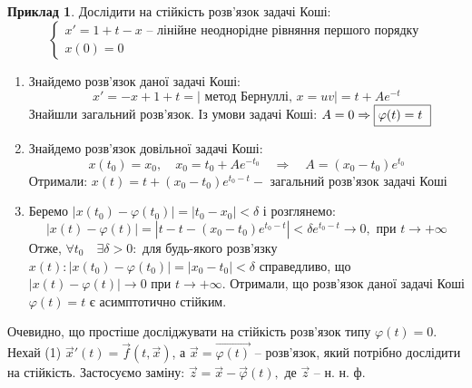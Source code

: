 \documentclass[14pt,a4paper]{scrartcl}
\theoremstyle{definition}
\newtheorem*{example}{Приклад}
\theoremstyle{definition}
\theoremstyle{definition}
\begin{document}
\begin{example}
    Дослідити на стійкість розв'язок  задачі Коші:
    $$
    \begin{cases}
        x' = 1 + t - x \text{  -- лінійне неоднорідне рівняння першого порядку}\\
        x(0) = 0
    \end{cases}
    $$
    \begin{enumerate}

    \item Знайдемо розв'язок даної задачі Коші:
    $$
    x' = - x + 1 + t = \left| \text{ метод Бернуллі, } x = uv \right| = t + Ae^{-t}
    $$
    Знайшли загальний розв'язок. Із умови задачі Коші: $ A = 0 \Rightarrow \fbox {$\varphi(t) = t$ }$

    \item Знайдемо розв'язок довільної задачі Коші:
    $$
    x(t_0) = x_0, \quad x_0 = t_0 + Ae^{-t_0} \quad \Rightarrow \quad A = (x_0 - t_0) e^{t_0}
    $$
    Отримали: $x(t) = t + (x_0 - t_0) e^{t_0 - t} - \text{ загальний розв'язок задачі Коші}$

    \item Беремо $\left| x(t_0) - \varphi(t_0) \right| = |t_0 - x_0| < \delta$ і розглянемо:
    $$\left| x(t) - \varphi(t) \right| = |t - t - (x_0 - t_0)e^{t_0 - t}| < \delta e^{t_0 - t} \rightarrow 0, \text{ при } t \rightarrow + \infty$$
    Отже, $\forall t_0 \quad \exists \delta > 0 :$ для будь-якого розв'язку $x(t): |x(t_0) - \varphi(t_0)| = |x_0 - t_0| < \delta$ справедливо, що $|x(t) - \varphi(t)| \rightarrow 0 \text{ при } t \rightarrow + \infty$. Отримали, що розв'язок даної задачі Коші $\varphi(t) = t$ є асимптотично стійким.
    \end{enumerate}
\end{example}

\remark
Очевидно, що простіше досліджувати на стійкість розв'язок типу $\varphi(t) = 0$. Нехай (1) $\vec{x}'(t) = \vec{f}(t, \vec{x})$, а $\vec{x} = \vec{\varphi(t)}$ -- розв'язок, який потрібно дослідити на стійкість. Застосуємо заміну: $\vec{z} = \vec{x} - \vec{\varphi}(t), \text{ де } \vec{z}$ -- н. н. ф.


% 
\end{document}
